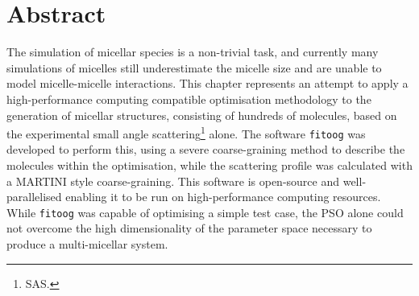\section*{Abstract}
The simulation of micellar species is a non-trivial task, and currently many simulations of micelles still underestimate the micelle size and are unable to model micelle-micelle interactions.
This chapter represents an attempt to apply a high-performance computing compatible optimisation methodology to the generation of micellar structures, consisting of hundreds of molecules, based on the experimental small angle scattering\footnote{SAS.} alone.
The software \texttt{fitoog} was developed to perform this, using a severe coarse-graining method to describe the molecules within the optimisation, while the scattering profile was calculated with a MARTINI style coarse-graining.
This software is open-source and well-parallelised enabling it to be run on high-performance computing resources.
While \texttt{fitoog} was capable of optimising a simple test case, the PSO alone could not overcome the high dimensionality of the parameter space necessary to produce a multi-micellar system.
